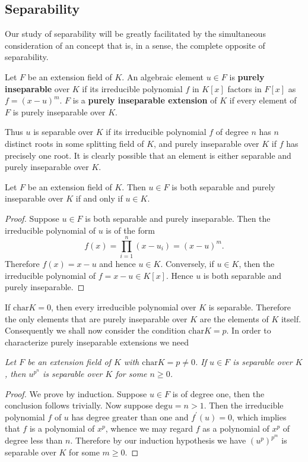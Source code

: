 \subsection{Separability}
Our study of separability will be greatly facilitated by the simultaneous consideration of an concept that is, in a sense, the complete opposite of separability.
\begin{definition}
Let $F$ be an extension field of $K$. An algebraic element $u\in F$ is \textbf{purely inseparable} over $K$ if its irreducible polynomial $f$ in $K[x]$ factors in $F[x]$ as $f=(x-u)^m$. $F$ is a \textbf{purely inseparable extension} of $K$ if every element of $F$ is purely inseparable over $K$.
\end{definition}
Thus $u$ is separable over $K$ if its irreducible polynomial $f$ of degree $n$ has $n$ distinct roots in some splitting field of $K$, and purely inseparable over $K$ if $f$ has precisely one root. It is clearly possible that an element is either separable and purely inseparable over $K$.
\begin{theorem}
Let $F$ be an extension field of $K$. Then $u\in F$ is both separable and purely inseparable over $K$ if and only if $u\in K$.
\end{theorem}
\begin{proof}
Suppose $u\in F$ is both separable and purely inseparable. Then the irreducible polynomial of $u$ is of the form 
$$
f\left( x \right) =\prod_{i=1}^n{\left( x-u_i \right)}=\left( x-u \right) ^m.
$$
Therefore $f(x)=x-u$ and hence $u\in K$. Conversely, if $u\in K$, then the irreducible polynomial of $f=x-u\in K[x]$. Hence $u$ is both separable and purely inseparable.
\end{proof}
If $\mathrm{char}K=0$, then every irreducible polynomial over $K$ is separable. Therefore the only elements that are purely inseparable over $K$ are the elements of $K$ itself. Consequently we shall now consider the condition $\mathrm{char}K=p$. In order to characterize purely inseparable extensions we need 
\begin{lemma}\em
Let $F$ be an extension field of $K$ with $\mathrm{char}K=p\ne 0$. If $u\in F$ is separable over $K$, then $u^{p^n}$ is separable over $K$ for some $n\ge 0$.
\end{lemma}
\begin{proof}
We prove by induction. Suppose $u\in F$ is of degree one, then the conclusion follows trivially. Now suppose $\mathrm{deg}u=n>1$. Then the irreducible polynomial $f$ of $u$ has degree greater than one and $f^\prime(u)=0$, which implies that $f$ is a polynomial of $x^p$, whence we may regard $f$ as a polynomial of $x^p$ of degree less than $n$. Therefore by our induction hypothesis we have $(u^p)^{p^m}$ is separable over $K$ for some $m\ge 0$.
\end{proof}
